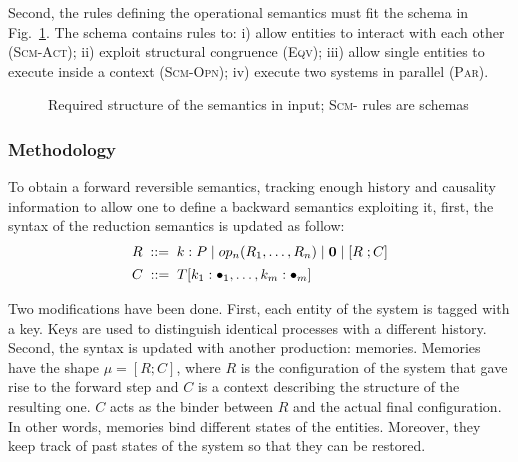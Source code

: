 \documentclass{article}[12pt,a4paper]
\theoremstyle{definition}
\newcommand{\paral}{\;|\;}
\begin{document}
Second, the rules defining the operational semantics must fit the schema in Fig.~\ref{fig:forwardrules}.
The schema contains rules to: i) allow entities to interact with each other (\textsc{Scm-Act}); ii)
exploit structural congruence (\textsc{Eqv}); iii) allow single entities to execute inside a context (\textsc{Scm-Opn});
iv) execute two systems in parallel (\textsc{Par}).

\begin{figure}[t]
  {\footnotesize
    }
  \caption{Required structure of the semantics in input; \textsc{Scm-} rules are schemas}
  \label{fig:forwardrules}
\end{figure}

\subsubsection{Methodology}\label{sec:methodology}


To obtain a forward reversible semantics, tracking enough history and causality information to allow one to define a backward semantics exploiting it, first, the syntax of the
reduction semantics is updated as follow:\\
\[
\begin{array}{l}
  R   \; ::=\;  k:P \paral \op(R_1,\ldots,R_n)\paral \nil \paral \mem{R}{\str} \\[1ex]
  \str \; ::= \; T[k_1:\blt_1,\dots,k_m:\blt_m]
\end{array}
\]

Two modifications have been done. First, each entity of the system is tagged with
a key. Keys are used to distinguish identical processes with a different
history. Second, the syntax is updated with another production: memories. Memories have
the shape $\mu=[R;C]$, where $R$ is the configuration of the
system that gave rise to the forward step and $C$ is a context describing the structure of the resulting one.
$C$ acts as the binder between $R$ and the actual final configuration. In
other words, memories bind different states of the entities. Moreover, they keep
track of past states of the system so that they can be restored.
\end{document}
